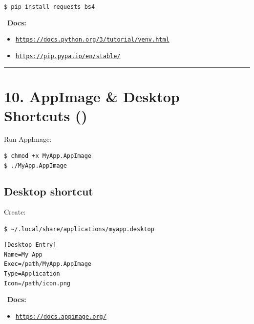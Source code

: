 \documentclass[12pt]{article}
\newcommand{\appicon}{\faDesktop}
\newcommand{\bookicon}{\faBook}
\begin{document}
\begin{highlightbox}
\texttt{\$ pip install requests bs4}
\end{highlightbox}

\begin{infobox}
\bookicon\ \textbf{Docs:}
\begin{itemize}
    \item \href{https://docs.python.org/3/tutorial/venv.html}{\texttt{https://docs.python.org/3/tutorial/venv.html}}
    \item \href{https://pip.pypa.io/en/stable/}{\texttt{https://pip.pypa.io/en/stable/}}
\end{itemize}
\end{infobox}

\vspace{1em}
\begin{center}
\color{teamred}\rule{0.8\textwidth}{1pt}
\end{center}

\section*{10. AppImage \& Desktop Shortcuts (\appicon)}

Run AppImage:

\begin{highlightbox}
\texttt{\$ chmod +x MyApp.AppImage}\\
\texttt{\$ ./MyApp.AppImage}
\end{highlightbox}

\subsection*{Desktop shortcut}

Create:

\begin{highlightbox}
\texttt{\$ \textasciitilde/.local/share/applications/myapp.desktop}
\end{highlightbox}

\begin{highlightbox}
\begin{verbatim}
[Desktop Entry]
Name=My App
Exec=/path/MyApp.AppImage
Type=Application
Icon=/path/icon.png
\end{verbatim}
\end{highlightbox}

\begin{infobox}
\bookicon\ \textbf{Docs:}
\begin{itemize}
    \item \href{https://docs.appimage.org/}{\texttt{https://docs.appimage.org/}}
\end{itemize}
\end{infobox}
\end{document}
